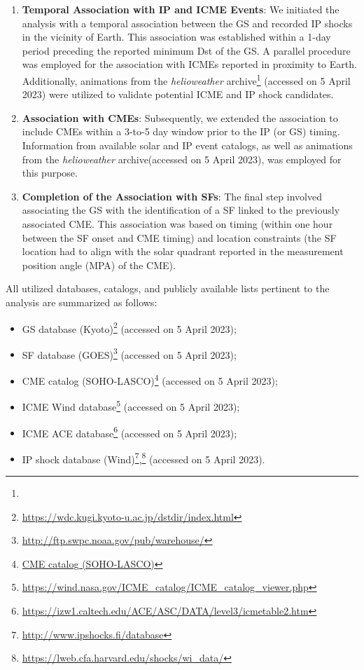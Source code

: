\begin{enumerate}
	\item \textbf{Temporal Association with IP and ICME Events}:
	We initiated the analysis with a temporal association between the GS and recorded IP shocks in the vicinity of Earth. This association was established within a 1-day period preceding the reported minimum Dst of the GS. A parallel procedure was employed for the association with ICMEs reported in proximity to Earth. Additionally, animations from the \textit{helioweather} archive\footnote{\helioweatherurl} (accessed on 5 April 2023) were utilized to validate potential ICME and IP shock candidates.
	
	\item \textbf{Association with CMEs}:
	Subsequently, we extended the association to include CMEs within a 3-to-5 day window prior to the IP (or GS) timing. Information from available solar and IP event catalogs, as well as animations from the \textit{helioweather} archive\footnotemark[\value{footnote}] (accessed on 5 April 2023), was employed for this purpose.
	
	\item \textbf{Completion of the Association with SFs}:
	The final step involved associating the GS with the identification of a SF linked to the previously associated CME. This association was based on timing (within one hour between the SF onset and CME timing) and location constraints (the SF location had to align with the solar quadrant reported in the measurement position angle (MPA) of the CME).
\end{enumerate}

All utilized databases, catalogs, and publicly available lists pertinent to the analysis are summarized as follows:

\begin{itemize}
	\item GS database (Kyoto)\footnote{\url{https://wdc.kugi.kyoto-u.ac.jp/dstdir/index.html}} (accessed on 5 April 2023);
	\item SF database (GOES)\footnote{\url{http://ftp.swpc.noaa.gov/pub/warehouse/}} (accessed on 5 April 2023);
	\item CME catalog (SOHO-LASCO)\footnote{\url{CME catalog (SOHO-LASCO)}} (accessed on 5 April 2023);
	\item ICME Wind database\footnote{\url{https://wind.nasa.gov/ICME_catalog/ICME_catalog_viewer.php}} (accessed on 5 April 2023);
	\item ICME ACE database\footnote{\url{https://izw1.caltech.edu/ACE/ASC/DATA/level3/icmetable2.htm}} (accessed on 5 April 2023);
	\item IP shock database (Wind)\footnote{\url{http://www.ipshocks.fi/database}},\footnote{\url{https://lweb.cfa.harvard.edu/shocks/wi_data/}} (accessed on 5 April 2023).
\end{itemize}

